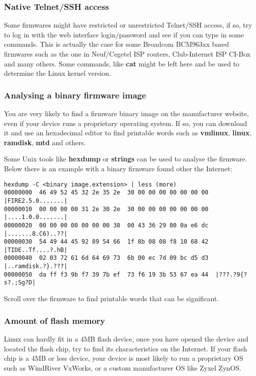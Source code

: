 \subsubsection{Native Telnet/SSH access}

Some firmwares might have restricted or unrestricted Telnet/SSH access, if so,
try to log in with the web interface login/password and see if you can type in 
some commands. This is actually the case for some Broadcom BCM963xx based firmwares
such as the one in Neuf/Cegetel ISP routers, Club-Internet ISP CI-Box and many 
others. Some commands, like \textbf{cat} might be left here and be used to 
determine the Linux kernel version.

\subsubsection{Analysing a binary firmware image}

You are very likely to find a firmware binary image on the manufacturer website,
even if your device runs a proprietary operating system. If so, you can download
it and use an hexadecimal editor to find printable words such as \textbf{vmlinux},
\textbf{linux}, \textbf{ramdisk}, \textbf{mtd} and others.

Some Unix tools like \textbf{hexdump} or \textbf{strings} can be used to analyse 
the firmware. Below there is an example with a binary firmware found other the Internet:

\begin{verbatim}
hexdump -C <binary image.extension> | less (more)
00000000  46 49 52 45 32 2e 35 2e  30 00 00 00 00 00 00 00  |FIRE2.5.0.......|
00000010  00 00 00 00 31 2e 30 2e  30 00 00 00 00 00 00 00  |....1.0.0.......|
00000020  00 00 00 00 00 00 00 38  00 43 36 29 00 0a e6 dc  |.......8.C6)..??|
00000030  54 49 44 45 92 89 54 66  1f 8b 08 08 f8 10 68 42  |TIDE..Tf....?.hB|
00000040  02 03 72 61 6d 64 69 73  6b 00 ec 7d 09 bc d5 d3  |..ramdisk.?}.???|
00000050  da ff f3 9b f7 39 7b ef  73 f6 19 3b 53 67 ea 44  |???.?9{?s?.;Sg?D|
\end{verbatim}

Scroll over the firmware to find printable words that can be significant.

\subsubsection{Amount of flash memory}

Linux can hardly fit in a 4MB flash device, once you have opened the device and 
located the flash chip, try to find its characteristics on the Internet. If
your flash chip is a 4MB or less device, your device is most likely to run a 
proprietary OS such as WindRiver VxWorks, or a custom manufacturer OS like Zyxel ZynOS.

